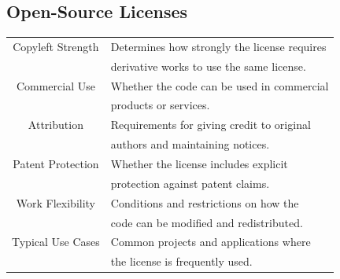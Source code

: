 \documentclass[10pt]{article}
\begin{document}
\begin{multicols}{2}
\subsection{Open-Source Licenses}
\begin{tabular}{C L}
  Copyleft Strength      & Determines how strongly the license requires\\
                         & derivative works to use the same license.\\
  Commercial Use        & Whether the code can be used in commercial\\
              & products or services.\\
  Attribution          & Requirements for giving credit to original\\
              & authors and maintaining notices.\\
  Patent Protection    & Whether the license includes explicit\\
              & protection against patent claims.\\
  Work Flexibility     & Conditions and restrictions on how the\\
              & code can be modified and redistributed.\\
  Typical Use Cases    & Common projects and applications where\\
              & the license is frequently used.\\
\end{tabular}
\end{multicols}
\end{document}
